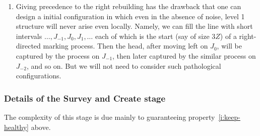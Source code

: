 \documentclass[11pt]{memoir}
\theoremstyle{definition} %
\def\B{B}
\newcommand{\Z}{Z} %
\begin{document}
\begin{remarks}\label{rem:rebuild-precedence} 
  \begin{enumerate}

\item Giving precedence to the right rebuilding has the drawback that one can design a initial configuration
  in which even in the absence of noise, level 1 structure will never arise even locally.
  Namely, we can fill the line with short intervals \( \dots,J_{-1},J_{0},J_{1},\dots \)
  each of which is the start (say of size \( 3\Z \)) of a
  right-directed marking process.
  Then the head, after moving left on \( J_{0} \), will be captured by the process on \( J_{-1} \), then
  later captured by the similar process on \( J_{-2} \), and so on.
  But we will not need to consider such pathological configurations.
  \end{enumerate}
  
\end{remarks}

\subsubsection*{Details of the Survey and Create stage}

The complexity of this stage is due mainly to guaranteeing
property~\eqref{i:keep-healthy} above.
\end{document}
